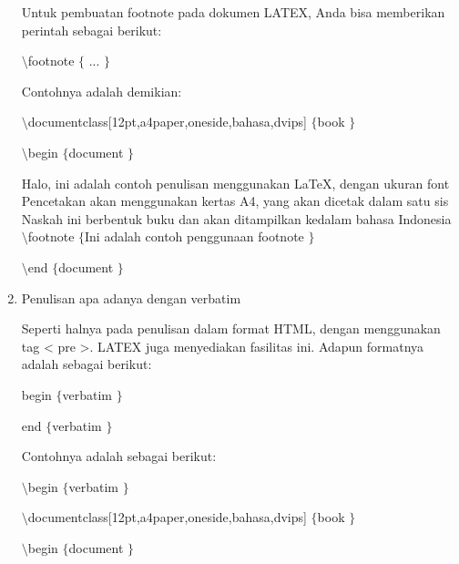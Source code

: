 \begin{enumerate}
Untuk pembuatan footnote pada dokumen LATEX, Anda bisa memberikan perintah sebagai berikut:  \par
\vspace{12pt}
{\fontsize{10pt}{10pt}\selectfont  $  \setminus  $footnote $  \{  $ ...  $  \}  $} \par
\vspace{12pt}
Contohnya adalah demikian: \par
{\fontsize{10pt}{10pt}\selectfont  $  \setminus  $documentclass[12pt,a4paper,oneside,bahasa,dvips] $  \{  $book $  \}  $} \par
{\fontsize{10pt}{10pt}\selectfont  $  \setminus  $begin $  \{  $document $  \}  $} \par
\vspace{12pt}
{\fontsize{10pt}{10pt}\selectfont Halo, ini adalah contoh penulisan menggunakan LaTeX, dengan ukuran font Pencetakan akan menggunakan kertas A4, yang akan dicetak dalam satu sis Naskah ini berbentuk buku dan akan ditampilkan kedalam bahasa Indonesia  $  \setminus  $footnote $  \{  $Ini adalah contoh penggunaan footnote $  \}  $} \par
\vspace{9pt}
{\fontsize{10pt}{10pt}\selectfont  $  \setminus  $end $  \{  $document $  \}  $} \par
\vspace{10pt}
\noindent 
\item  Penulisan apa adanya dengan verbatim \par
Seperti halnya pada penulisan dalam format HTML, dengan menggunakan tag < pre >. LATEX juga menyediakan fasilitas ini. Adapun formatnya adalah sebagai berikut: \par
begin $  \{  $verbatim $  \}  $ \par
[kalimat] \par
end $  \{  $verbatim $  \}  $ \par
\vspace{8pt}
\vspace{8pt}
Contohnya adalah sebagai berikut: \par
{\fontsize{10pt}{10pt}\selectfont  $  \setminus  $begin $  \{  $verbatim $  \}  $} \par
{\fontsize{10pt}{10pt}\selectfont  $  \setminus  $documentclass[12pt,a4paper,oneside,bahasa,dvips] $  \{  $book $  \}  $} \par
{\fontsize{10pt}{10pt}\selectfont  $  \setminus  $begin $  \{  $document $  \}  $} \par
\vspace{10pt}

\end{enumerate}
